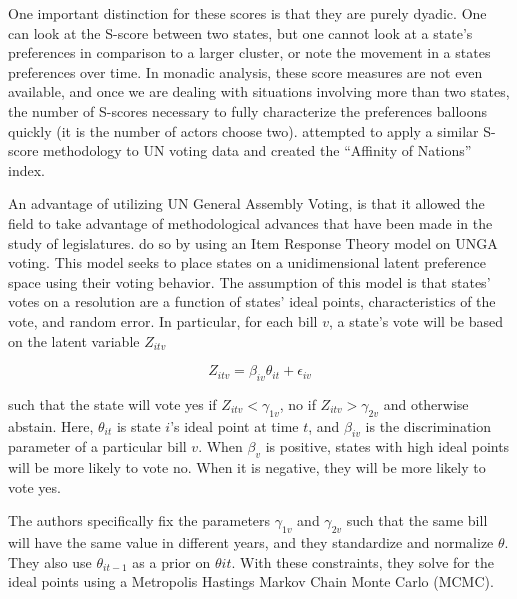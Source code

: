 One important distinction for these scores is that they are purely dyadic. One can look at the S-score between two states, but one cannot look at a state's preferences in comparison to a larger cluster, or note the movement in a states preferences over time. In monadic analysis, these score measures are not even available, and once we are dealing with situations involving more than two states, the number of S-scores necessary to fully characterize the preferences balloons quickly (it is the number of actors choose two). \citet{gartzke:1998} attempted to apply a similar S-score methodology to UN voting data and created the ``Affinity of Nations'' index.

An advantage of utilizing UN General Assembly Voting, is that it allowed the field to take advantage of methodological advances that have been made in the study of legislatures. \citet{bailey:etal:2015} do so by using an Item Response Theory model on UNGA voting. This model seeks to place states on a unidimensional latent preference space using their voting behavior. The assumption of this model is that states' votes on a resolution are a function of states' ideal points, characteristics of the vote, and random error. In particular, for each bill $v$, a state's vote will be based on the latent variable $Z_{itv}$

\begin{equation}
	Z_{itv} = \beta_{iv}\theta_{it} + \epsilon_{iv}
\end{equation}

such that the state will vote yes if $Z_{itv} < \gamma_{1v}$, no if $Z_{itv} > \gamma_{2v}$ and otherwise abstain. Here, $\theta_{it}$ is state $i$'s ideal point at time $t$, and $\beta_{iv}$ is the discrimination parameter of a particular bill $v$. When $\beta_{v}$ is positive, states with high ideal points will be more likely to vote no. When it is negative, they will be more likely to vote yes.

The authors specifically fix the parameters $\gamma_{1v}$ and $\gamma_{2v}$ such that the same bill will have the same value in different years, and they standardize and normalize $\theta$. They also use $\theta_{it-1}$ as a prior on $\theta{it}$. With these constraints, they solve for the ideal points using a Metropolis Hastings Markov Chain Monte Carlo (MCMC).

